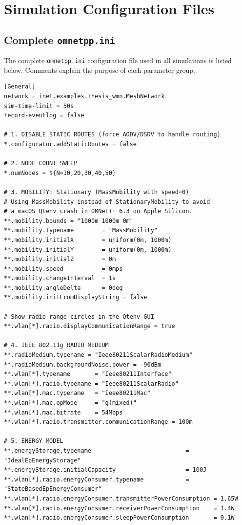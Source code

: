 \chapter{Simulation Configuration Files}
\label{app:config}

\section{Complete \texttt{omnetpp.ini}}
\label{app:omnetpp_ini}

The complete \texttt{omnetpp.ini} configuration file used in all simulations is listed
below. Comments explain the purpose of each parameter group.

\begin{lstlisting}[caption={Complete \texttt{omnetpp.ini} simulation configuration.},
                   label={lst:omnetpp_ini}]
[General]
network = inet.examples.thesis_wmn.MeshNetwork
sim-time-limit = 50s
record-eventlog = false

# 1. DISABLE STATIC ROUTES (force AODV/DSDV to handle routing)
*.configurator.addStaticRoutes = false

# 2. NODE COUNT SWEEP
*.numNodes = ${N=10,20,30,40,50}

# 3. MOBILITY: Stationary (MassMobility with speed=0)
# Using MassMobility instead of StationaryMobility to avoid
# a macOS Qtenv crash in OMNeT++ 6.3 on Apple Silicon.
**.mobility.bounds = "1000m 1000m 0m"
**.mobility.typename        = "MassMobility"
**.mobility.initialX        = uniform(0m, 1000m)
**.mobility.initialY        = uniform(0m, 1000m)
**.mobility.initialZ        = 0m
**.mobility.speed           = 0mps
**.mobility.changeInterval  = 1s
**.mobility.angleDelta      = 0deg
**.mobility.initFromDisplayString = false

# Show radio range circles in the Qtenv GUI
**.wlan[*].radio.displayCommunicationRange = true

# 4. IEEE 802.11g RADIO MEDIUM
**.radioMedium.typename = "Ieee80211ScalarRadioMedium"
**.radioMedium.backgroundNoise.power = -90dBm
**.wlan[*].typename       = "Ieee80211Interface"
**.wlan[*].radio.typename = "Ieee80211ScalarRadio"
**.wlan[*].mac.typename   = "Ieee80211Mac"
**.wlan[*].mac.opMode     = "g(mixed)"
**.wlan[*].mac.bitrate    = 54Mbps
**.wlan[*].radio.transmitter.communicationRange = 100m

# 5. ENERGY MODEL
**.energyStorage.typename                           = "IdealEpEnergyStorage"
**.energyStorage.initialCapacity                    = 100J
**.wlan[*].radio.energyConsumer.typename            = "StateBasedEpEnergyConsumer"
**.wlan[*].radio.energyConsumer.transmitterPowerConsumption = 1.65W
**.wlan[*].radio.energyConsumer.receiverPowerConsumption    = 1.4W
**.wlan[*].radio.energyConsumer.sleepPowerConsumption       = 0.1W


\end{lstlisting}
